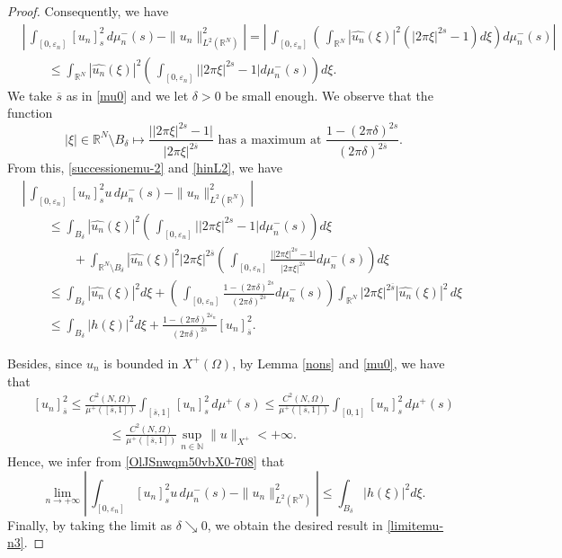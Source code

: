 \documentclass[12pt,a4paper,intlimits,sumlimits]{amsart}
\def \N {\mathbb{N}}
\def \R {\mathbb{R}}
\theoremstyle{definition}
\theoremstyle{plain}
\numberwithin{equation}{section}
\renewcommand{\le}{\leqslant}
\begin{document}
\begin{proof}
Consequently, we have
\[
\begin{split}
&\left|\,\int_{[0, \varepsilon_n]} [u_n]^2_s\, d\mu^-_n(s) - \|u_n\|^2_{L^2(\R^N)} \right| = \left|\,\int_{[0, \varepsilon_n]} \left(\,\int_{\R^N}|\widehat{u_n}(\xi)|^2 (|2\pi\xi|^{2s}-1) d\xi \right) d\mu^-_n(s)\right|\\
&\qquad\le \int_{\R^N} |\widehat{u_n}(\xi)|^2 \left(\,\int_{[0, \varepsilon_n]} \big| |2\pi\xi|^{2s}-1\big| d\mu^-_n(s)\right) d\xi.
\end{split}
\]
We take $\overline s$ as in \eqref{mu0} and we let $\delta>0$ be small enough.  We observe that the function
\[
|\xi|\in\R^N\setminus B_\delta \mapsto \frac{\big| |2\pi\xi|^{2s}-1\big|}{|2\pi\xi|^{2\overline s}} \mbox{ has a maximum at } \frac{1-(2\pi\delta)^{2s}}{(2\pi\delta)^{2\overline s}}.
\]
From this, \eqref{successionemu-2} and \eqref{hinL2}, we have
\begin{equation}\label{OlJSnwqm50vbX0-708}
\begin{split}
&\left|\,\int_{[0, \varepsilon_n]} [u_n]^2_s u\, d\mu^-_n(s) - \|u_n\|^2_{L^2(\R^N)} \right|\\
&\qquad\le\int_{B_\delta} |\widehat{u_n}(\xi)|^2 \left(\,\int_{[0, \varepsilon_n]} \big| |2\pi\xi|^{2s}-1\big| d\mu^-_n(s)\right) d\xi \\
&\qquad\qquad+ \int_{\R^N\setminus B_\delta} |\widehat{u_n}(\xi)|^2 |2\pi\xi|^{2\overline s}\left(\,\int_{[0, \varepsilon_n]} \frac{\big| |2\pi\xi|^{2s}-1\big|}{|2\pi\xi|^{2\overline s}} d\mu^-_n(s)\right) d\xi\\
&\qquad\le \int_{B_\delta} |\widehat{u_n}(\xi)|^2 d\xi + \left(\,\int_{[0, \varepsilon_n]}\frac{1-(2\pi\delta)^{2s}}{(2\pi\delta)^{2\overline s}} d\mu^-_n(s)\right)\int_{\R^N} |2\pi\xi|^{2\overline s} |\widehat{u_n}(\xi)|^2\, d\xi\\
&\qquad\le \int_{B_\delta} |h(\xi)|^2 d\xi + \frac{1-(2\pi\delta)^{2\varepsilon_n}}{(2\pi\delta)^{2\overline s}} [u_n]^2_{\overline s}.
\end{split}
\end{equation}

Besides, since $u_n$ is bounded in $X^+(\Omega)$, by Lemma \ref{nons} and \eqref{mu0}, we have that
\begin{eqnarray*}&&
[u_n]^2_{\overline s} \le \frac{C^2(N, \Omega)}{\mu^+([\overline s, 1])} \int_{[\overline s, 1]} [u_n]^2_s \, d\mu^+(s) \le\frac{ C^2(N, \Omega)}{\mu^+([\overline s, 1])} \int_{[0, 1]} [u_n]^2_s \, d\mu^+(s)\\&&\qquad\qquad\qquad\le \frac{ C^2(N, \Omega)}{\mu^+([\overline s, 1])}\sup_{n\in\N}
\|u\|_{X^+}<+\infty.
\end{eqnarray*}
Hence, we infer from \eqref{OlJSnwqm50vbX0-708} that
\[
\lim_{n\to +\infty}\left|\,\int_{[0, \varepsilon_n]} [u_n]^2_s u\, d\mu^-_n(s) - \|u_n\|^2_{L^2(\R^N)} \right| \le  \int_{B_\delta} |h(\xi)|^2 d\xi.
\]
Finally, by taking the limit as $\delta\searrow 0$, we obtain the desired result in \eqref{limitemu-n3}.
\end{proof}
\end{document}
